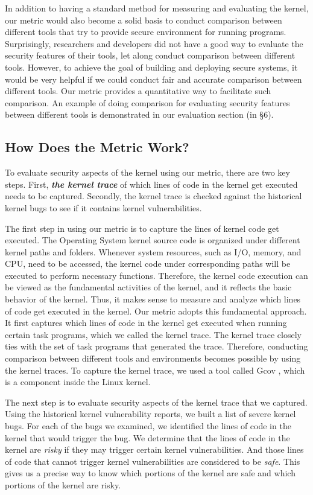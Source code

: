 In addition to having a standard method for measuring and evaluating the kernel, 
our metric would also become a solid basis to conduct comparison between different tools that try to 
provide secure environment for running programs. 
Surprisingly, researchers and developers did not have a good way to evaluate the security features 
of their tools, let along conduct comparison between different tools. However, to achieve the 
goal of building and deploying secure systems, it would be very helpful if we could conduct fair and accurate 
comparison between different tools. Our metric provides a quantitative way to 
facilitate such comparison. An example of doing comparison for evaluating security features between different tools is 
demonstrated in our evaluation section (in \S{6}).

\subsection{How Does the Metric Work?}
To evaluate security aspects of the kernel using our metric, there are two key steps. First, 
\textbf{\textit{the kernel trace}} of which lines of code in the kernel get executed needs to be captured. 
Secondly, the kernel trace is checked against the historical kernel bugs to see if it contains kernel vulnerabilities. 

The first step in using our metric is to capture the lines of kernel code get executed. 
The Operating System kernel source code is organized under different kernel paths and folders. 
Whenever system resources, such as I/O, memory, and CPU, need to be accessed, the kernel code 
under corresponding paths will be executed to perform necessary functions. Therefore, the kernel code 
execution can be viewed as the fundamental activities of the kernel, and it reflects the basic behavior of 
the kernel. Thus, it makes sense to measure and analyze which lines of code get executed in the kernel. 
Our metric adopts this fundamental approach. It first captures which lines of code in the kernel get executed 
when running certain task programs, which we called the kernel trace. The kernel trace closely
ties with the set of task programs that generated the trace. Therefore, conducting comparison between 
different tools and environments becomes possible by using the kernel traces. To capture the kernel trace, 
we used a tool called Gcov , which is a component inside the Linux kernel.

The next step is to evaluate security aspects of the kernel trace that we captured. Using the historical kernel vulnerability 
reports, we built a list of severe kernel bugs. For each of the bugs we examined, we identified the lines of code 
in the kernel that would trigger the bug.  We determine that the lines of code in the kernel are \textit{risky} if they 
may trigger certain kernel vulnerabilities. And those lines of code that cannot trigger kernel vulnerabilities are 
considered to be \textit{safe}. This gives us a precise way to know which portions of the kernel are safe and which 
portions of the kernel are risky. 

